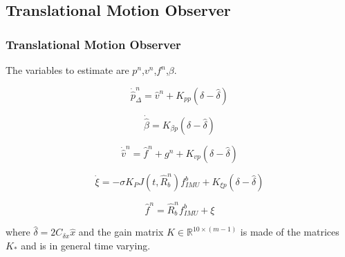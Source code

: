 \documentclass{beamer}
\begin{document}
    \subsection{Translational Motion Observer}
	\begin{frame}
		\frametitle{Translational Motion Observer}
		The variables to estimate are $p^n$,$v^n$,$f^n$,$\beta$.
		
		\[ \dot{\hat{p}}^n_\Delta = \hat{v}^n + K_{pp}(\delta - \hat{\delta})  \]
		
		\[ \dot{\hat{\beta}} = K_{\beta p} (\delta - \hat{\delta}) \]
		
		\[ \dot{\hat{v}}^n = \hat{f}^n + g^n + K_{vp}(\delta - \hat{\delta})\]
		
		\[ \dot{\xi} = - \sigma K_P J(t, \hat{R}^n_b)f^b_{IMU} + K_{\xi p}(\delta - \hat{\delta}) \]
		
		\[ \hat{f}^n = \hat{R}^n_b f^b_{IMU} + \xi  \]
		
		where $\hat{\delta} = 2C_{\delta x}\hat{x}$ and the gain matrix $K \in \mathds{R}^{10\times(m-1)}$ is made of the matrices $K_*$ and is in general time varying.
	\end{frame}
\end{document}
